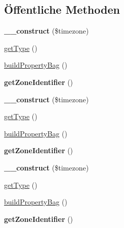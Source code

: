 \subsection*{Öffentliche Methoden}
\begin{DoxyCompactItemize}
\item 
\mbox{\label{class_eluceo_1_1i_cal_1_1_component_1_1_timezone_a925591d6a07fe91c9eecc515d378d071}} 
{\bfseries \+\_\+\+\_\+construct} (\$timezone)
\item 
\mbox{\hyperlink{class_eluceo_1_1i_cal_1_1_component_1_1_timezone_aa6dd55a9a67eec7d5a41ef9bfecda0fe}{get\+Type}} ()
\item 
\mbox{\hyperlink{class_eluceo_1_1i_cal_1_1_component_1_1_timezone_acacd4943d69ebc9db900c33748c4e404}{build\+Property\+Bag}} ()
\item 
\mbox{\label{class_eluceo_1_1i_cal_1_1_component_1_1_timezone_adbe753a262c3980816ed93587841cd90}} 
{\bfseries get\+Zone\+Identifier} ()
\item 
\mbox{\label{class_eluceo_1_1i_cal_1_1_component_1_1_timezone_a925591d6a07fe91c9eecc515d378d071}} 
{\bfseries \+\_\+\+\_\+construct} (\$timezone)
\item 
\mbox{\hyperlink{class_eluceo_1_1i_cal_1_1_component_1_1_timezone_aa6dd55a9a67eec7d5a41ef9bfecda0fe}{get\+Type}} ()
\item 
\mbox{\hyperlink{class_eluceo_1_1i_cal_1_1_component_1_1_timezone_acacd4943d69ebc9db900c33748c4e404}{build\+Property\+Bag}} ()
\item 
\mbox{\label{class_eluceo_1_1i_cal_1_1_component_1_1_timezone_adbe753a262c3980816ed93587841cd90}} 
{\bfseries get\+Zone\+Identifier} ()
\item 
\mbox{\label{class_eluceo_1_1i_cal_1_1_component_1_1_timezone_a925591d6a07fe91c9eecc515d378d071}} 
{\bfseries \+\_\+\+\_\+construct} (\$timezone)
\item 
\mbox{\hyperlink{class_eluceo_1_1i_cal_1_1_component_1_1_timezone_aa6dd55a9a67eec7d5a41ef9bfecda0fe}{get\+Type}} ()
\item 
\mbox{\hyperlink{class_eluceo_1_1i_cal_1_1_component_1_1_timezone_acacd4943d69ebc9db900c33748c4e404}{build\+Property\+Bag}} ()
\item 
\mbox{\label{class_eluceo_1_1i_cal_1_1_component_1_1_timezone_adbe753a262c3980816ed93587841cd90}} 
{\bfseries get\+Zone\+Identifier} ()
\end{DoxyCompactItemize}

